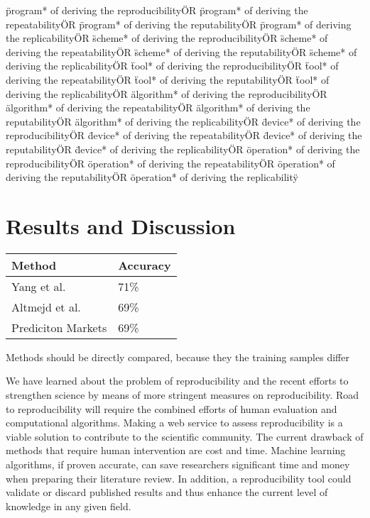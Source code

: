 \documentclass[
10pt, %
a4paper, %
oneside, %
headinclude,footinclude, %
BCOR5mm, %
]{scrartcl}
\begin{document}
\"program* of deriving the reproducibility\" OR \"program* of deriving the repeatability\" OR \"program* of deriving the reputability\" OR \"program* of deriving the replicability\" OR 
\"scheme* of deriving the reproducibility\" OR \"scheme* of deriving the repeatability\" OR \"scheme* of deriving the reputability\" OR \"scheme* of deriving the replicability\" OR 
\"tool* of deriving the reproducibility\" OR \"tool* of deriving the repeatability\" OR \"tool* of deriving the reputability\" OR \"tool* of deriving the replicability\" OR 
\"algorithm* of deriving the reproducibility\" OR \"algorithm* of deriving the repeatability\" OR \"algorithm* of deriving the reputability\" OR \"algorithm* of deriving the replicability\" OR 
\"device* of deriving the reproducibility\" OR \"device* of deriving the repeatability\" OR \"device* of deriving the reputability\" OR \"device* of deriving the replicability\" OR 
\"operation* of deriving the reproducibility\" OR \"operation* of deriving the repeatability\" OR \"operation* of deriving the reputability\" OR \"operation* of deriving the replicability\" 


\section{Results and Discussion}

\begin{table}[!ht]
    \centering
    \begin{tabular}{|l|l|}
    \hline
        Method & Accuracy \\ \hline
        Yang et al.  & 71\% \\ \hline
        Altmejd et al.  & 69\% \\ \hline
        Prediciton Markets  & 69\% \\ \hline
    \end{tabular}
\newline \centering * Methods should be directly compared, because they the training samples differ
\end{table}

We have learned about the problem of reproducibility and the recent efforts to strengthen science by means of more stringent measures on reproducibility. 
Road to reproducibility will require the combined efforts of human evaluation and computational algorithms. Making a web service to assess reproducibility is a viable solution to contribute to the scientific community. 
The current drawback of methods that require human intervention are cost and time. Machine learning algorithms, if proven accurate, can save researchers significant time and money when preparing their literature review. 
In addition, a reproducibility tool could validate or discard published results and thus enhance the current level of knowledge in any given field. 
\end{document}
